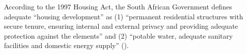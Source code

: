 \documentclass[12pt]{article}
\begin{document}










According to the 1997 Housing Act, the South African Government defines adequate ``housing development'' as (1) ``permanent residential structures with secure tenure, ensuring internal and external privacy and providing adequate protection against the elements'' and (2) ``potable water, adequate sanitary facilities and domestic energy supply'' (\cite{housingact}).  
\end{document}
